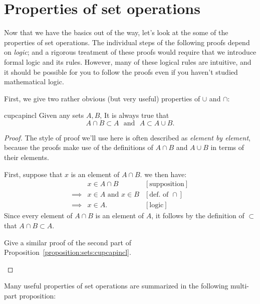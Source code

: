 \section{Properties of set operations \quad
{}} \label{propset}

Now that we have the basics out of the way, let's look at the some of  the properties of set operations.
The individual steps of the following proofs depend on \emph{logic}; and a rigorous treatment  of these proofs would require that we introduce formal logic and its rules. However, many of these logical rules are intuitive, and it should be possible for you to follow the proofs even if you haven't studied mathematical logic.

 First, we give two rather obvious (but very useful) properties of $\cup$ and $\cap$:

\begin{prop}{cupcapincl}
Given any sets $A,B$, It is always true that
\[
A \cap B \subset A \mathrm{~~~and~~~}A \subset A \cup B.
\]
\end{prop}
\begin{proof}
The style of proof we'll use here  is often described as \emph{element by element}, because the proofs make use of the definitions of $A\cap B$ and $A\cup B$ in terms of their elements. 

First, suppose that $x$ is an element of $A \cap B$. we then have:
\begin{align*}
&x \in A \cap B &[\text{supposition}]\\
\implies &x \in A \text{ and } x\in B &[\text{def. of }\cap]\\
\implies &x \in A.&[\text{logic}]
\end{align*}
Since every element of $A \cap B$ is an element of $A$, it follows by the definition of $\subset$ that $A \cap B \subset A$.

\begin{exercise}{23}
Give a similar proof of the second part of Proposition~\ref{proposition:sets:cupcapincl}.
\end{exercise}
\end{proof}

Many useful properties of set operations are summarized in the following multi-part proposition: 

